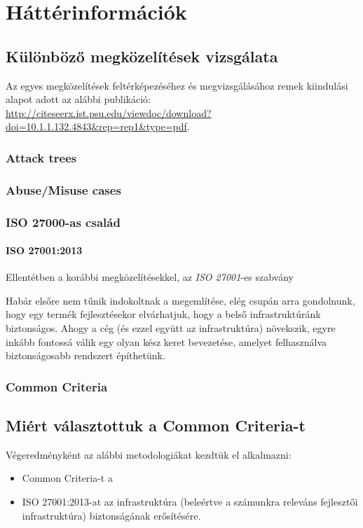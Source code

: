 \chapter{Háttérinformációk}

\section{Különböző megközelítések vizsgálata}

Az egyes megközelítések feltérképezéséhez és megvizsgálásához remek kiindulási alapot adott az
alábbi publikáció: \url{http://citeseerx.ist.psu.edu/viewdoc/download?doi=10.1.1.132.4843&rep=rep1&type=pdf}.

\subsection{Attack trees}
\subsection{Abuse/Misuse cases}
\subsection{ISO 27000-as család}
\subsubsection{ISO 27001:2013}
Ellentétben a korábbi megközelítésekkel, az \emph{ISO 27001}-es szabvány 

Habár elsőre nem tűnik indokoltnak a megemlítése, elég csupán arra gondolnunk, hogy
egy termék fejlesztésekor elvárhatjuk, hogy a belső infrastruktúránk biztonságos.
Ahogy a cég (és ezzel együtt az infrastruktúra) növekszik, egyre inkább fontossá
válik egy olyan kész keret bevezetése, amelyet felhasználva biztonságosabb rendszert építhetünk.

\subsection{Common Criteria}

\section{Miért választottuk a Common Criteria-t}

Végeredményként az alábbi metodologiákat kezdtük el alkalmazni:
\begin{itemize}
\item Common Criteria-t a 
\item{ISO 27001:2013-at az infrastruktúra (beleértve a számunkra releváns fejlesztői infrastruktúra)
    biztonságának erősítésére.}
\end{itemize}

